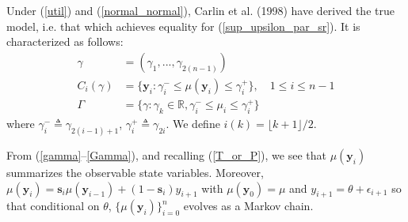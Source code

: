 \documentclass[11pt]{article}
\begin{document}
Under (\ref{util}) and (\ref{normal_normal}), Carlin et al. (1998)
have derived the true model, i.e. that which achieves equality for
(\ref{sup_upsilon_par_sr}). It is characterized as follows:
\begin{align}\label{gamma}
\gamma&=(\gamma_1,...,\gamma_{2(n-1)})\\
\label{C_i_param} C_{i}(\gamma)&= \{\mathbf{y}_i:
\gamma_{i}^{-}\leq\mu(\mathbf{y}_{i})\leq \gamma_{i}^{+}\}, \quad
1\leq i\leq n-1\\\label{Gamma} \Gamma&=\{\gamma: \gamma_k \in
\mathbb{R}, \gamma_i^{-}\leq \mu_i \leq\gamma_i^{+}\}
\end{align} where $\gamma_{i}^{-}\triangleq\gamma_{2(i-1)+1}$,
$\gamma_{i}^{+}\triangleq \gamma_{2i}$. We define $i(k)=\lfloor k+1
\rfloor/2$.

From (\ref{gamma}--\ref{Gamma}), and recalling (\ref{T_or_P}), we
see that $\mu(\mathbf{y}_{i})$ summarizes the observable state
variables. Moreover, $\mu(\mathbf{y}_i)=\mathbf{s}_i
\mu(\mathbf{y}_{i-1})+(1-\mathbf{s}_i)y_{i+1}$ with
$\mu(\mathbf{y}_0)=\mu$ and $y_{i+1}=\theta+\epsilon_{i+1}$ so that
conditional on $\theta$, $\{\mu(\mathbf{y}_i)\}_{i=0}^{n}$ evolves
as a Markov chain.
\end{document}
